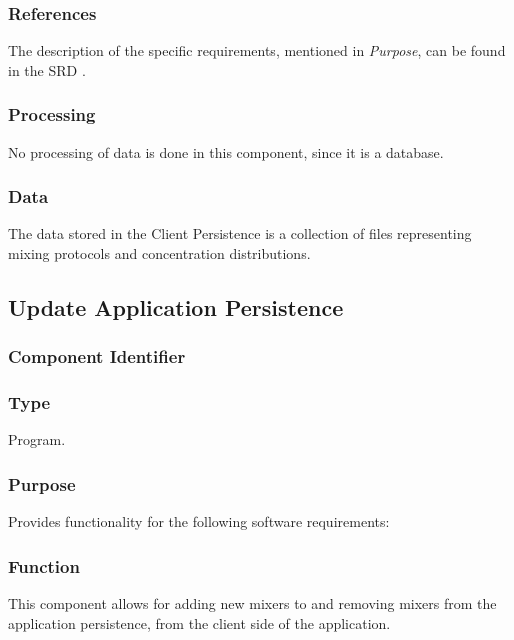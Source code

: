\subsubsection*{References}
The description of the specific requirements, mentioned in \emph{Purpose}, can be found in the SRD \cite{srd}.

\subsubsection*{Processing}
No processing of data is done in this component, since it is a database.

\subsubsection*{Data}
The data stored in the Client Persistence is a collection of files representing mixing protocols and concentration distributions.

\subsection{Update Application Persistence}

\subsubsection*{Component Identifier}
\RTMCUAP{}

\subsubsection*{Type}
Program.

\subsubsection*{Purpose}
Provides functionality for the following software requirements:

\noindent {}

\subsubsection*{Function}
This component allows for adding new mixers to and removing mixers from the application persistence, from the client side of the application.

